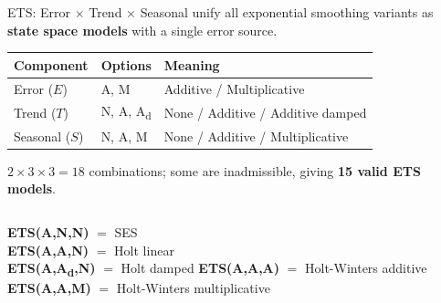 \documentclass[aspectratio=169, 11pt]{beamer}
\begin{document}
\begin{frame}{ETS: Error $\times$ Trend $\times$ Seasonal}
  \textcite{Hyndman2021} unify all exponential smoothing variants as
  \textbf{state space models} with a single error source.
  \begin{center}
    {\small
    \begin{tabular}{lll}
      \toprule
      \textbf{Component} & \textbf{Options} & \textbf{Meaning} \\
      \midrule
      Error ($E$)    & A, M
                     & Additive / Multiplicative \\
      Trend ($T$)    & N, A, A\textsubscript{d}
                     & None / Additive / Additive damped \\
      Seasonal ($S$) & N, A, M
                     & None / Additive / Multiplicative \\
      \bottomrule
    \end{tabular}
    }
  \end{center}
  $2 \times 3 \times 3 = 18$ combinations; some are inadmissible,
  giving \textbf{15 valid ETS models}.

  \vspace{0.1cm}
  \begin{columns}[T]
      \textbf{ETS(A,N,N)} $=$ SES\\
      \textbf{ETS(A,A,N)} $=$ Holt linear\\
      \textbf{ETS(A,A\textsubscript{d},N)} $=$ Holt damped
      \textbf{ETS(A,A,A)} $=$ Holt-Winters additive\\
      \textbf{ETS(A,A,M)} $=$ Holt-Winters multiplicative\\
  \end{columns}
\end{frame}
\end{document}
